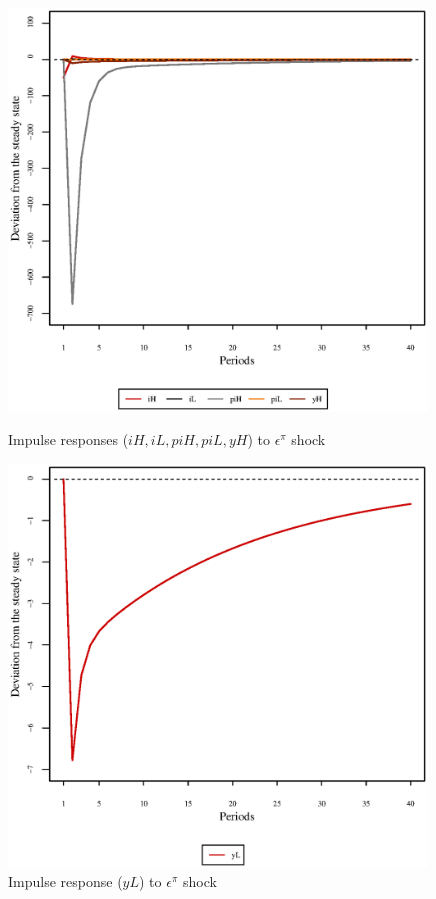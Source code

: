 \begin{figure}[h]
\begin{minipage}{0.5\textwidth}
\vspace*{-3em}
\centering
\includegraphics[width=0.99\textwidth, scale=0.55]{plots/plot_3.eps}
\caption{Impulse responses (${i\!H}, {i\!L}, {p\!i\!H}, {p\!i\!L}, {y\!H}$) to $\epsilon^{\pi}$ shock}
\end{minipage}
\begin{minipage}{0.5\textwidth}
\vspace*{-3em}
\centering
\includegraphics[width=0.99\textwidth, scale=0.55]{plots/plot_4.eps}
\caption{Impulse response (${y\!L}$) to $\epsilon^{\pi}$ shock}
\end{minipage}
\end{figure}



